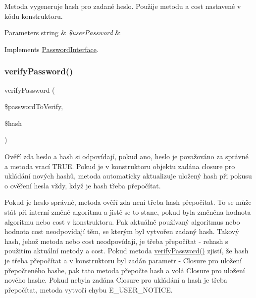 Metoda vygeneruje hash pro zadané heslo. Použije metodu a cost nastavené v kódu konstruktoru.


\begin{DoxyParams}[1]{Parameters}
string & {\em \$user\+Password} & \\
\hline
\end{DoxyParams}


Implements \mbox{\hyperlink{interface_pes_1_1_security_1_1_password_1_1_password_interface}{Password\+Interface}}.

\mbox{\label{class_pes_1_1_security_1_1_password_1_1_password_a66a5774f5734e6d66c32c500bf9ea335}} 
\subsubsection{\texorpdfstring{verify\+Password()}{verifyPassword()}}
{\footnotesize\ttfamily verify\+Password (\begin{DoxyParamCaption}\item[{}]{\$password\+To\+Verify,  }\item[{}]{\$hash }\end{DoxyParamCaption})}

Ověří zda heslo a hash si odpovídají, pokud ano, heslo je považováno za správné a metoda vrací T\+R\+UE. Pokud je v konstruktoru objektu zadána closure pro ukládání nových hashů, metoda automaticky aktualizuje uložený hash při pokusu o ověření hesla vždy, když je hash třeba přepočítat.

Pokud je heslo správné, metoda ověří zda není třeba hash přepočítat. To se může stát při interní změně algoritmu a jistě se to stane, pokud byla změněna hodnota algoritmu nebo cost v konstruktoru. Pak aktuálně používaný algoritmus nebo hodnota cost neodpovídají těm, se kterým byl vytvořen zadaný hash. Takový hash, jehož metoda nebo cost neodpovídají, je třeba přepočítat -\/ rehash s použitím aktuální metody a cost. Pokud metoda \mbox{\hyperlink{class_pes_1_1_security_1_1_password_1_1_password_a66a5774f5734e6d66c32c500bf9ea335}{verify\+Password()}} zjistí, že hash je třeba přepočítat a v konstruktoru byl zadán parametr -\/ Closure pro uložení přepočteného hashe, pak tato metoda přepočte hash a volá Closure pro uložení nového hashe. Pokud nebyla zadána Closure pro ukládání a hash je třeba přepočítat, metoda vytvoří chybu E\+\_\+\+U\+S\+E\+R\+\_\+\+N\+O\+T\+I\+CE.


